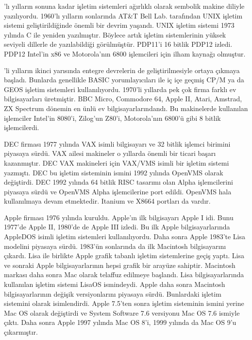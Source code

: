 \documentclass[a4paper,10pt,turkish]{sphinxmanual}
\begin{document}
’lı yılların sonuna kadar işletim sistemleri ağırlıklı olarak sembolik makine diliyle
yazılıyordu. 1960’lı yılların sonlarında AT\&T Bell Lab. tarafından UNIX işletim sistemi
geliştirildiğinde önemli bir devrim yaşandı. UNIX işletim sistemi 1973 yılında C ile yeniden
yazılmıştır. Böylece artık işletim sistemlerinin yüksek seviyeli dillerle de yazılabildiği
görülmüştür. PDP\sphinxhyphen{}11’i 16 bitlik PDP\sphinxhyphen{}12 izledi. PDP\sphinxhyphen{}12 Intel’in x86 ve Motorola’nın 6800
işlemcileri için ilham kaynağı olmuştur.

’li yılların ikinci yarısında entegre devrelerin de geliştirilmesiyle  ortaya çıkmaya başladı. Bunlarda genellikle BASIC yorumlayıcıları ile iç
içe geçmiş CP/M ya da GEOS işletim sistemleri kullanılıyordu. 1970’li yıllarda pek çok
firma farklı ev bilgisayarları üretmiştir. BBC Micro, Commodore 64, Apple II, Atari,
Amstrad, ZX Spectrum dönemin en ünlü ev bilgisayarlarındandı. Bu makinelerde kullanılan
işlemciler Intel’in 8080’i, Zilog’un Z80’i, Motorola’nın 6800’ü gibi 8 bitlik
işlemcilerdi.

\sphinxAtStartPar
DEC firması 1977 yılında VAX isimli bilgisayarı ve 32 bitlik işlemci birimini piyasaya
sürdü. VAX ailesi makineler o yıllarda önemli bir ticari başarı kazanmıştır. DEC VAX
makineleri için VAX/VMS isimli bir işletim sistemi yazmıştı. DEC bu işletim sisteminin
ismini 1992 yılında OpenVMS olarak değiştirdi. DEC 1992 yılında 64 bitlik RISC tasarımı
olan Alpha işlemcilerini piyasaya sürdü ve OpenVMS Alpha işlemcilerine port edildi. OpenVMS
hala kullanılmaya devam etmektedir. Itanium ve X86\sphinxhyphen{}64 portları da vardır.

\sphinxAtStartPar
Apple firması 1976 yılında kuruldu. Apple’ın ilk bilgisayarı Apple I idi. Bunu 1977’de
Apple II, 1980’de de Apple III izledi. Bu ilk Apple bilgisayarlarında AppleDOS isimli
işletim sistemleri kullanılıyordu. Daha sonra Apple 1983’te Lisa modelini piyasaya sürdü.
1983’ün sonlarında da ilk Macintosh bilgisayarını çıkardı. Lisa ile birlikte Apple grafik
tabanlı işletim sistemlerine geçiş yaptı. Lisa ve sonraki Apple bilgisayarlarının hepsi
grafik bir arayüze sahiptir. Macintosh markası daha sonra Mac olarak telaffuz edilmeye
başlandı. Lisa bilgisayarlarında kullanılan işletim sistemi LisaOS ismindeydi. Apple daha
sonra Macintosh bilgisayarlarının değişik versiyonlarını piyasaya sürdü. Bunlardaki işletim
sistemini  olarak isimlendirdi. Apple  7.5’ten sonra işletim
sisteminin ismini  yerine Mac OS olarak değiştirdi ve System Software 7.6
versiyonu Mac OS 7.6 ismiyle çıktı. Daha sonra Apple 1997 yılında Mac OS 8’i, 1999 yılında
da Mac OS 9’u çıkarmıştır.
\end{document}
